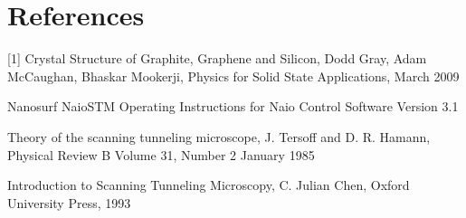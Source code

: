 \documentclass{article}
\begin{document}
\section{References}

 [1] Crystal Structure of Graphite, Graphene and Silicon, Dodd Gray, Adam McCaughan, Bhaskar Mookerji, Physics for Solid State Applications, March 2009


\noindent [2] Nanosurf NaioSTM Operating Instructions for Naio Control Software Version 3.1

\noindent [3] Theory of the scanning tunneling microscope, J. Tersoff and D. R. Hamann, Physical Review B Volume 31, Number 2 January 1985

\noindent [4] Introduction to Scanning Tunneling Microscopy, C. Julian Chen, Oxford University Press, 1993
\end{document}
